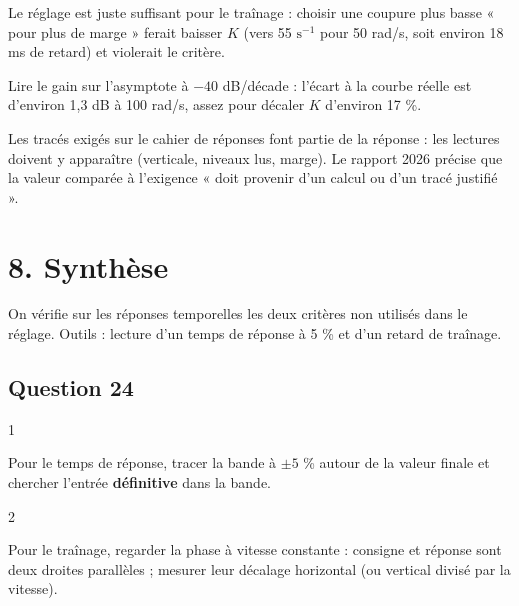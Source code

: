 \documentclass[11pt,a4paper]{article}
\begin{document}
Le réglage est juste suffisant pour le traînage : choisir une coupure plus basse « pour plus de marge » ferait baisser \(K\) (vers 55 \(\mathrm{s^{-1}}\) pour 50 rad/s, soit environ 18 ms de retard) et violerait le critère.

\begin{piege}

Lire le gain sur l'asymptote à \(-40\) dB/décade : l'écart à la courbe réelle est d'environ 1,3 dB à 100 rad/s, assez pour décaler \(K\) d'environ 17 \%.

\end{piege}

\begin{jury}

Les tracés exigés sur le cahier de réponses font partie de la réponse : les lectures doivent y apparaître (verticale, niveaux lus, marge). Le rapport 2026 précise que la valeur comparée à l'exigence « doit provenir d'un calcul ou d'un tracé justifié ».

\end{jury}

\hypertarget{synthuxe8se}{%
\section{8. Synthèse}\label{synthuxe8se}}

On vérifie sur les réponses temporelles les deux critères non utilisés dans le réglage. Outils : lecture d'un temps de réponse à 5 \% et d'un retard de traînage.

\hypertarget{question-24}{%
\subsection{Question 24}\label{question-24}}

\begin{indication}{1}

Pour le temps de réponse, tracer la bande à \(\pm5\) \% autour de la valeur finale et chercher l'entrée \textbf{définitive} dans la bande.

\end{indication}

\begin{indication}{2}

Pour le traînage, regarder la phase à vitesse constante : consigne et réponse sont deux droites parallèles ; mesurer leur décalage horizontal (ou vertical divisé par la vitesse).

\end{indication}
\end{document}
